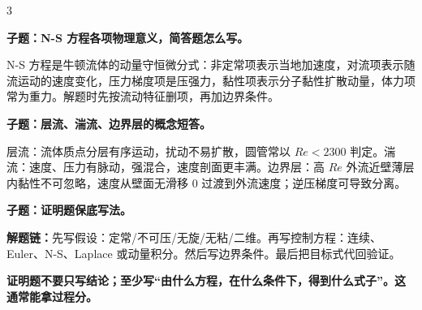 \documentclass[a4paper]{article}
\newcommand{\qt}[1]{\vspace{0.25pt}\colorbox{Q}{\parbox{\dimexpr\linewidth-2\fboxsep}{\color{white}\bfseries #1}}\par}
\newcommand{\ans}[1]{\colorbox{G}{\parbox{\dimexpr\linewidth-2\fboxsep}{#1}}\par}
\newcommand{\warn}[1]{\colorbox{Y}{\parbox{\dimexpr\linewidth-2\fboxsep}{\color{E}\bfseries #1}}\par}
\newcommand{\chain}[1]{{\color{A}\bfseries 解题链：}#1\par}
\begin{document}
\begin{multicols}{3}
\qt{子题：N-S 方程各项物理意义，简答题怎么写。}
\ans{N-S 方程是牛顿流体的动量守恒微分式：非定常项表示当地加速度，对流项表示随流运动的速度变化，压力梯度项是压强力，黏性项表示分子黏性扩散动量，体力项常为重力。解题时先按流动特征删项，再加边界条件。}

\qt{子题：层流、湍流、边界层的概念短答。}
\ans{层流：流体质点分层有序运动，扰动不易扩散，圆管常以 $Re<2300$ 判定。湍流：速度、压力有脉动，强混合，速度剖面更丰满。边界层：高 $Re$ 外流近壁薄层内黏性不可忽略，速度从壁面无滑移 0 过渡到外流速度；逆压梯度可导致分离。}

\qt{子题：证明题保底写法。}
\chain{先写假设：定常/不可压/无旋/无粘/二维。再写控制方程：连续、Euler、N-S、Laplace 或动量积分。然后写边界条件。最后把目标式代回验证。}
\warn{证明题不要只写结论；至少写“由什么方程，在什么条件下，得到什么式子”。这通常能拿过程分。}



\end{multicols}
\end{document}
